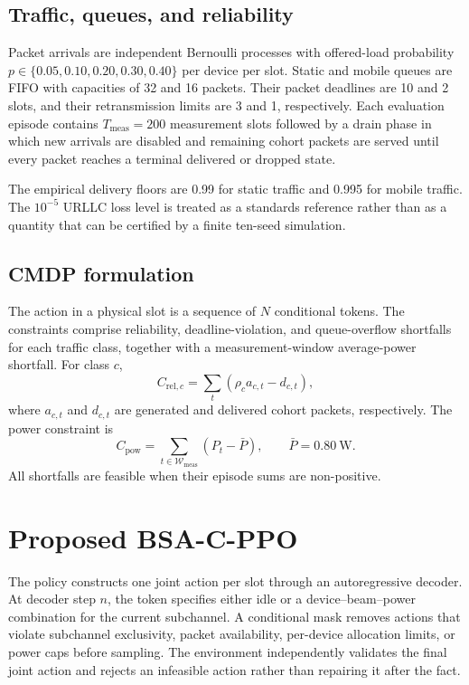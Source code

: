 \documentclass[number]{autarticle}
\begin{document}
\subsection{Traffic, queues, and reliability}
Packet arrivals are independent Bernoulli processes with offered-load probability
$p\in\{0.05,0.10,0.20,0.30,0.40\}$ per device per slot. Static and mobile queues are FIFO with capacities of 32 and 16 packets. Their packet deadlines are 10 and 2 slots, and their retransmission limits are 3 and 1, respectively. Each evaluation episode contains $T_{\mathrm{meas}}=200$ measurement slots followed by a drain phase in which new arrivals are disabled and remaining cohort packets are served until every packet reaches a terminal delivered or dropped state.

The empirical delivery floors are 0.99 for static traffic and 0.995 for mobile traffic. The $10^{-5}$ URLLC loss level is treated as a standards reference rather than as a quantity that can be certified by a finite ten-seed simulation.

\subsection{CMDP formulation}
The action in a physical slot is a sequence of $N$ conditional tokens. The constraints comprise reliability, deadline-violation, and queue-overflow shortfalls for each traffic class, together with a measurement-window average-power shortfall. For class $c$,
\begin{equation}
C_{\mathrm{rel},c}=\sum_t\left(\rho_c a_{c,t}-d_{c,t}\right),
\end{equation}
where $a_{c,t}$ and $d_{c,t}$ are generated and delivered cohort packets, respectively. The power constraint is
\begin{equation}
C_{\mathrm{pow}}=\sum_{t\in\mathcal{W}_{\mathrm{meas}}}\left(P_t-\bar P\right),\qquad \bar P=0.80~\mathrm{W}.
\end{equation}
All shortfalls are feasible when their episode sums are non-positive.



\section{Proposed BSA-C-PPO}\label{proposed-method}
The policy constructs one joint action per slot through an autoregressive decoder. At decoder step $n$, the token specifies either idle or a device--beam--power combination for the current subchannel. A conditional mask removes actions that violate subchannel exclusivity, packet availability, per-device allocation limits, or power caps before sampling. The environment independently validates the final joint action and rejects an infeasible action rather than repairing it after the fact.
\end{document}
